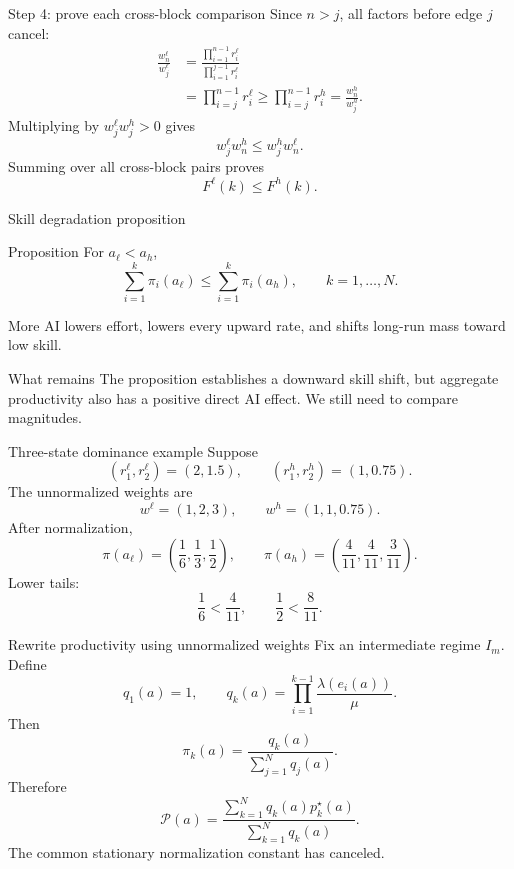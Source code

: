 \documentclass[aspectratio=169,10pt]{beamer}
\newcommand{\calP}{\mathcal{P}}
\begin{document}
\begin{frame}{Step 4: prove each cross-block comparison}
Since $n>j$, all factors before edge $j$ cancel:
\begin{align*}
\frac{w_n^\ell}{w_j^\ell}
&=
\frac{\prod_{i=1}^{n-1}r_i^\ell}
{\prod_{i=1}^{j-1}r_i^\ell}\\
&=
\prod_{i=j}^{n-1}r_i^\ell
\ge
\prod_{i=j}^{n-1}r_i^h
=
\frac{w_n^h}{w_j^h}.
\end{align*}
Multiplying by $w_j^\ell w_j^h>0$ gives
\[
w_j^\ell w_n^h\le w_j^h w_n^\ell.
\]
Summing over all cross-block pairs proves
\[
F^\ell(k)\le F^h(k).
\]
\end{frame}

\begin{frame}{Skill degradation proposition}
\begin{block}{Proposition}
For $a_\ell<a_h$,
\[
\boxed{
\sum_{i=1}^k\pi_i(a_\ell)
\le
\sum_{i=1}^k\pi_i(a_h),
\qquad k=1,\ldots,N.}
\]
\end{block}
\vspace{3mm}
\begin{center}
\large More AI lowers effort, lowers every upward rate, and shifts long-run mass toward low skill.
\end{center}
\vspace{3mm}
\begin{alertblock}{What remains}
The proposition establishes a downward skill shift, but aggregate productivity also has a positive direct AI effect. We still need to compare magnitudes.
\end{alertblock}
\end{frame}

\begin{frame}{Three-state dominance example}
Suppose
\[
(r_1^\ell,r_2^\ell)=(2,1.5),
\qquad
(r_1^h,r_2^h)=(1,0.75).
\]
The unnormalized weights are
\[
w^\ell=(1,2,3),
\qquad
w^h=(1,1,0.75).
\]
After normalization,
\[
\pi(a_\ell)=
\left(\frac16,\frac13,\frac12\right),
\qquad
\pi(a_h)=
\left(\frac4{11},\frac4{11},\frac3{11}\right).
\]
Lower tails:
\[
\frac16<\frac4{11},
\qquad
\frac12<\frac8{11}.
\]
\end{frame}

\begin{frame}{Rewrite productivity using unnormalized weights}
Fix an intermediate regime $I_m$. Define
\[
q_1(a)=1,
\qquad
q_k(a)=
\prod_{i=1}^{k-1}
\frac{\lambda(e_i(a))}{\mu}.
\]
Then
\[
\pi_k(a)=
\frac{q_k(a)}
{\sum_{j=1}^Nq_j(a)}.
\]
Therefore
\[
\boxed{
\calP(a)=
\frac{
\sum_{k=1}^Nq_k(a)p_k^\star(a)}
{\sum_{k=1}^Nq_k(a)}.}
\]
The common stationary normalization constant has canceled.
\end{frame}
\end{document}
